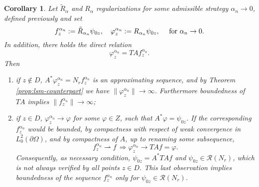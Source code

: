 \documentclass[10pt, a4paper, twoside, openright]{book}
\theoremstyle{definition}
\theoremstyle{plain}
\theoremstyle{plain}
\newtheorem{corollary}[subsection]{Corollary}
\theoremstyle{plain}
\theoremstyle{plain}
\theoremstyle{plain}
\theoremstyle{plain}
\theoremstyle{plain}
\theoremstyle{plain}
\let\phi\varphi
\begin{document}
\begin{corollary}
 Let $\tilde{R}_\alpha$ and $R_\alpha$ regularizations for some admissible strategy $\alpha_n\to 0$, defined previously and set
 \begin{equation}
  f_z^{\alpha_n}:=\tilde{R}_{\alpha_n}\psi_{0z},\quad \phi_z^{\alpha_n}:=R_{\alpha_n}\psi_{0z},\quad\textup{ for }\alpha_n \to 0.
 \end{equation}
 In addition, there holds the direct relation
 \begin{equation}
  \phi_z^{\alpha_n} = TAf_z^{\alpha_n}.
 \end{equation}
Then
\begin{enumerate}
 \item if $z\notin D$, $A^*\phi_z^{\alpha_n} = {N_r}f_z^{\alpha_n}$ is an 
 approximating sequence, and by Theorem \ref{prop:lsm-counterpart} we have $\|\phi_z^{\alpha_n}\|\to\infty$. Furthermore boundedness of $TA$ implies $\|f_z^{\alpha_n}\|\to\infty$;
 \item if $z \in D$, $\phi_z^{\alpha_n}\to \phi$ for some $\phi\in Z$, such that $A^*\phi = \psi_{0z}$. If the corresponding $f_z^{\alpha_n}$ would be bounded, by compactness with respect of weak convergence in $L^2_0(\partial\Omega)$, and by compactness of $A$, up to renaming some subsequence,
 \begin{equation}
  f_z^{\alpha_n}\rightharpoonup f \,\Rightarrow \phi_z^{\alpha_n} \to TA f = \phi.
 \end{equation}
Consequently, as necessary condition, $\psi_{0z}=A^*TAf$ and $\psi_{0z}\in\mathcal{R}({N_r})$, which is not always verified by all points $z\in D$.
This last observation implies boundedness of the sequence $f_z^{\alpha_n}$ only for $\psi_{0z}\in\mathcal{R}({N_r})$.
\end{enumerate}
\end{corollary}
\end{document}
